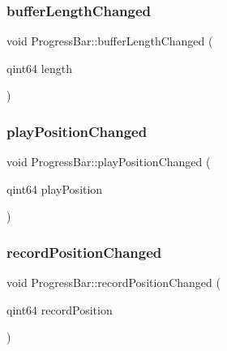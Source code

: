 \subsubsection{\texorpdfstring{buffer\+Length\+Changed}{bufferLengthChanged}}
{\footnotesize\ttfamily void Progress\+Bar\+::buffer\+Length\+Changed (\begin{DoxyParamCaption}\item[{qint64}]{length }\end{DoxyParamCaption})\hspace{0.3cm}{\ttfamily [slot]}}

\hypertarget{class_progress_bar_af664f472f1c6832796c4e0a280a7aeed}{}\label{class_progress_bar_af664f472f1c6832796c4e0a280a7aeed} 
\subsubsection{\texorpdfstring{play\+Position\+Changed}{playPositionChanged}}
{\footnotesize\ttfamily void Progress\+Bar\+::play\+Position\+Changed (\begin{DoxyParamCaption}\item[{qint64}]{play\+Position }\end{DoxyParamCaption})\hspace{0.3cm}{\ttfamily [slot]}}

\hypertarget{class_progress_bar_af3575d9c0166bf9cd5dfe46b66ba1142}{}\label{class_progress_bar_af3575d9c0166bf9cd5dfe46b66ba1142} 
\subsubsection{\texorpdfstring{record\+Position\+Changed}{recordPositionChanged}}
{\footnotesize\ttfamily void Progress\+Bar\+::record\+Position\+Changed (\begin{DoxyParamCaption}\item[{qint64}]{record\+Position }\end{DoxyParamCaption})\hspace{0.3cm}{\ttfamily [slot]}}

\hypertarget{class_progress_bar_a9ccd597a098a693f9364741fc69a3de2}{}\label{class_progress_bar_a9ccd597a098a693f9364741fc69a3de2} 
